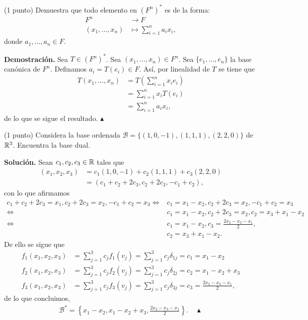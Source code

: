 \documentclass[11pt]{scrartcl}
\begin{document}
\begin{mdframed}[style=mdpurplebox, frametitle={Ejercicio 6, Tarea 11, Álgebra Lineal I}]
    (1 punto) Demuestra que todo elemento en $(F^n)^*$ es de la forma:
    \begin{align*}
        F^n &\rightarrow F \\
        (x_1,...,x_n) &\mapsto \sum_{i=1}^{n}a_ix_i,
    \end{align*}
    donde $a_1,...,a_n \in F$.
\end{mdframed}
\textbf{Demostración.} Sea $T \in (F^n)^*$. Sea $(x_1,...,x_n) \in F^n$. Sea $\{e_1,...,e_n\}$ la base canónica de $F^n$.
Definamos $a_i=T(e_i) \in F$. Así, por linealidad de $T$ se tiene que
\begin{align*}
    T(x_1,...,x_n) &= T\left(\sum_{i=1}^{n}x_ie_i\right) \\
    &= \sum_{i=1}^{n}x_iT(e_i) \\
    &= \sum_{i=1}^{n}a_ix_i,
\end{align*}
de lo que se sigue el resultado. $\blacktriangle$
\begin{mdframed}[style=mdpurplebox, frametitle={Ejercicio 7, Tarea 11, Álgebra Lineal I}]
    (1 punto) Considera la base ordenada $\mathcal{B} = \{(1,0,-1),(1,1,1),(2,2,0)\}$ de $\mathbb R^3$. Encuentra la base dual.
\end{mdframed}
\textbf{Solución.} Sean $c_1,c_2,c_3 \in \mathbb R$ tales que
\begin{align*}
    (x_1,x_2,x_3)&=c_1(1,0,-1)+c_2(1,1,1)+c_3(2,2,0) \\
    &=(c_1+c_2+2c_3,c_2+2c_3,-c_1+c_2),
\end{align*}
con lo que afirmamos
\begin{align*}
    c_1+c_2+2c_3=x_1, c_2+2c_3=x_2, -c_1+c_2=x_3 \iff& c_1=x_1-x_2, c_2+2c_3=x_2, -c_1+c_2=x_3 \\
    \iff& c_1=x_1-x_2, c_2+2c_3=x_2, c_2=x_3+x_1-x_2 \\
    \iff& c_1=x_1-x_2, c_3=\frac{2x_2-x_3-x_1}{2}, \\ 
    &c_2=x_3+x_1-x_2.
\end{align*}
De ello se sigue que
\begin{align*}
    f_1(x_1,x_2,x_3) &= \sum_{j=1}^{3}c_jf_1(v_j) = \sum_{j=1}^{3}c_j\delta_{1j}=c_1=x_1-x_2 \\
    f_2(x_1,x_2,x_3) &= \sum_{j=1}^{3}c_jf_2(v_j) = \sum_{j=1}^{3}c_j\delta_{2j}=c_2=x_1-x_2+x_3 \\
    f_3(x_1,x_2,x_3) &= \sum_{j=1}^{3}c_jf_3(v_j) = \sum_{j=1}^{3}c_j\delta_{3j}=c_3=\frac{2x_2-x_3-x_1}{2},
\end{align*}
de lo que concluimos,
\begin{align*}
    \mathcal{B}^*=\left\{x_1-x_2,x_1-x_2+x_3,\frac{2x_2-x_3-x_1}{2}\right\}. \quad \blacktriangle
\end{align*}
\end{document}
